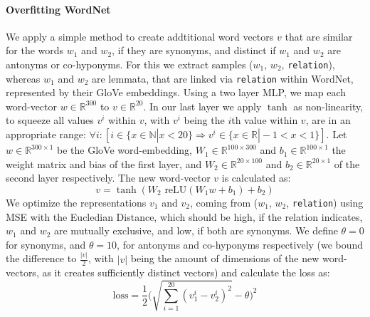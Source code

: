 \paragraph*{Overfitting WordNet}
We apply a simple method to create addtitional word vectors $v$ that are similar for the words $w_1$ and $w_2$, if they are synonyms, and distinct if $w_1$ and $w_2$ are antonyms or co-hyponyms. For this we extract samples ($w_1$, $w_2$, \texttt{relation}), whereas $w_1$ and $w_2$ are lemmata, that are linked via \texttt{relation} within WordNet, represented by their GloVe embeddings. Using a two layer \ac{MLP}, we map each word-vector $w \in \mathbb{R}^{300}$ to $v \in \mathbb{R}^{20}$. In our last layer we apply $\tanh$ as non-linearity, to squeeze all values $v^i$ within $v$, with $v^i$ being the $i$th value within $v$, are in an appropriate range:  $ \forall i: [i \in \{x \in \mathbb{N} | x < 20\} \Rightarrow v^i \in \{x \in \mathbb{R} | -1 < x < 1\}]$. Let $w \in \mathbb{R}^{300 \times 1}$ be the GloVe word-embedding, $W_1 \in \mathbb{R}^{100 \times 300}$ and $b_1 \in \mathbb{R}^{100 \times 1}$ the weight matrix and bias of the first layer, and $W_2 \in \mathbb{R}^{20 \times 100}$ and $b_2 \in \mathbb{R}^{20 \times 1}$ of the second layer respectively. The new word-vector $v$ is calculated as:
\begin{equation}
v = \tanh(W_2 \text{ reLU}(W_1w + b_1) + b_2)
\end{equation}
We optimize the representations $v_1$ and $v_2$, coming from ($w_1$, $w_2$, \texttt{relation}) using \ac{MSE} with the Eucledian Distance, which should be high, if the relation indicates, $w_1$ and $w_2$ are mutually exclusive, and low, if both are synonyms. We define $\theta=0$ for synonyms, and $\theta =10$, for antonyms and co-hyponyms respectively (we bound the difference to $\frac{|v|}{2}$, with $|v|$ being the amount of dimensions of the new word-vectors, as it creates sufficiently distinct vectors) and calculate the loss as:
\begin{equation}\label{eq:loss_embd}
\text{loss} = \frac{1}{2}\Bigg( \sqrt{\sum^{20}_{i=1}(v^i_1 - v^i_2)^2} - \theta\Bigg)^2
\end{equation}

